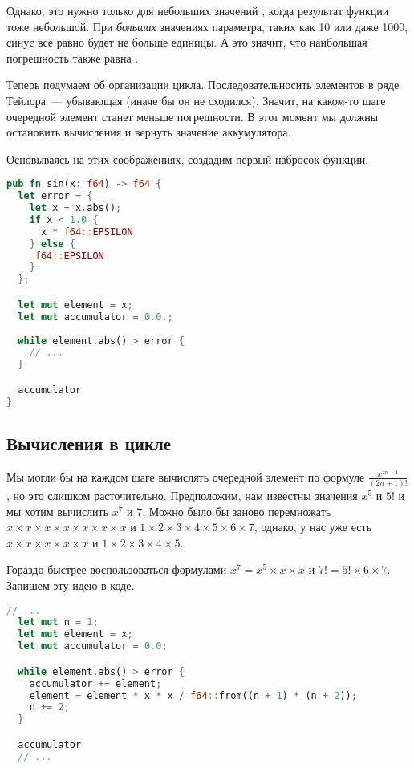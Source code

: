 Однако, это нужно только для небольших значений , когда результат функции тоже небольшой.
При {\em больших} значениях параметра, таких как 10 или даже 1000, синус всё равно будет не больше единицы.
А это значит, что наибольшая погрешность также равна .

Теперь подумаем об организации цикла.
Последовательносить элементов в ряде Тейлора~--- убывающая (иначе бы он не сходился).
Значит, на каком-то шаге очередной элемент станет меньше погрешности.
В этот момент мы должны остановить вычисления и вернуть значение аккумулятора.

Основываясь на этих соображениях, создадим первый набросок функции.

\begin{lstlisting}[language=Rust]
pub fn sin(x: f64) -> f64 {
  let error = {
    let x = x.abs();
    if x < 1.0 {
      x * f64::EPSILON
    } else {
     f64::EPSILON
    }
  };

  let mut element = x;
  let mut accumulator = 0.0.;
    
  while element.abs() > error {
    // ...
  }

  accumulator
}
\end{lstlisting}

\subsection{Вычисления в цикле}

Мы могли бы на каждом шаге вычислять очередной элемент по формуле $\frac{x^{2n + 1}}{(2n + 1)!}$, но это слишком расточительно.
Предположим, нам известны значения $x^5$ и $5!$ и мы хотим вычислить $x^7$ и $7$.
Можно было бы заново перемножать $x\times x\times x\times x\times x\times x\times x$ и $1\times 2\times 3\times 4\times 5\times 6\times 7$, однако, у нас уже есть $x\times x\times x\times x\times x$ и $1\times 2\times 3\times 4\times 5$.

Гораздо быстрее воспользоваться формулами $x^7 = x^5\times x\times x$ и $7! = 5!\times 6\times 7$.
Запишем эту идею в коде.

\begin{lstlisting}[language=Rust]
  // ...
  let mut n = 1;
  let mut element = x;
  let mut accumulator = 0.0;

  while element.abs() > error {
    accumulator += element;
    element = element * x * x / f64::from((n + 1) * (n + 2));
    n += 2;
  }

  accumulator
  // ...
\end{lstlisting}

